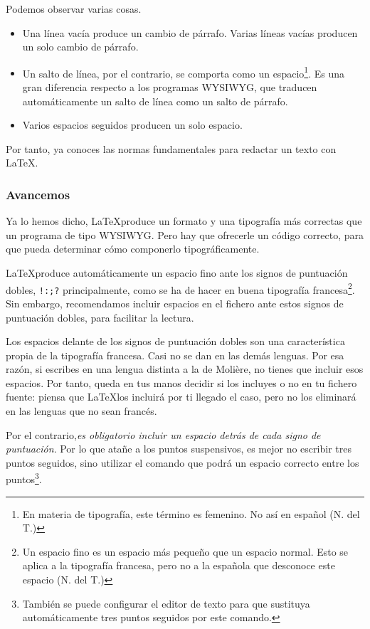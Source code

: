 Podemos observar varias cosas.
\begin{itemize}
\item Una línea vacía produce un cambio de párrafo. Varias líneas vacías producen un solo cambio de párrafo.
\item Un salto de línea, por el contrario, se comporta como un espacio\footnote{En materia de tipografía, este término es femenino. No así en español (N. del T.)}. Es una gran diferencia respecto a los programas WYSIWYG, que traducen automáticamente un salto de línea como un salto de párrafo.
\item Varios espacios seguidos producen un solo espacio. 
\end{itemize}

Por tanto, ya conoces las normas fundamentales para redactar un texto con \LaTeX.

\subsubsection{Avancemos}

Ya lo hemos dicho, \LaTeX produce un formato y una tipografía más correctas que un programa de tipo WYSIWYG. Pero hay que ofrecerle un código correcto, para que pueda determinar cómo componerlo tipográficamente.

\LaTeX produce automáticamente un espacio fino ante los signos de puntuación dobles, \verb|!:;?| principalmente, como se ha de hacer en buena tipografía francesa\footnote{Un espacio fino es un espacio más pequeño que un espacio normal. Esto se aplica a la tipografía francesa, pero no a la española que desconoce este espacio (N. del T.)}. Sin embargo, recomendamos incluir espacios en el fichero  ante estos signos de puntuación dobles, para facilitar la lectura.

\begin{attention}
Los espacios delante de los signos de puntuación dobles son una característica propia de la tipografía francesa. Casi no se dan en las demás lenguas. Por esa razón, si escribes en una lengua distinta a la de Molière, no tienes que incluir esos espacios. Por tanto, queda en tus manos decidir si los incluyes o no en tu fichero fuente: piensa que \LaTeX los incluirá por ti llegado el caso, pero no los eliminará en las lenguas que no sean francés.
\end{attention}

Por el contrario,\emph{es obligatorio incluir un espacio detrás de cada signo de puntuación}. Por lo que atañe a los puntos suspensivos, es mejor no escribir tres puntos seguidos, sino utilizar el comando  que podrá un espacio correcto entre los puntos\footnote{También se puede configurar el editor de texto para que sustituya automáticamente tres puntos seguidos por este comando.}.

